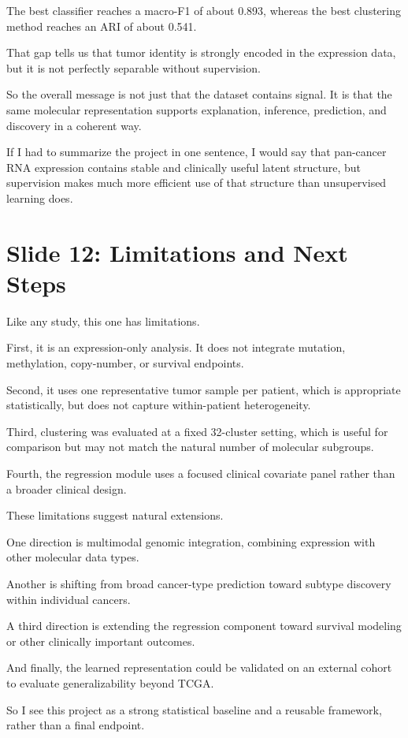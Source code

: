 \documentclass[12pt]{article}
\begin{document}
The best classifier reaches a macro-F1 of about 0.893, whereas the best clustering method reaches an ARI of about 0.541.

That gap tells us that tumor identity is strongly encoded in the expression data, but it is not perfectly separable without supervision.

So the overall message is not just that the dataset contains signal. It is that the same molecular representation supports explanation, inference, prediction, and discovery in a coherent way.

If I had to summarize the project in one sentence, I would say that pan-cancer RNA expression contains stable and clinically useful latent structure, but supervision makes much more efficient use of that structure than unsupervised learning does.

\section{Slide 12: Limitations and Next Steps}
Like any study, this one has limitations.

First, it is an expression-only analysis. It does not integrate mutation, methylation, copy-number, or survival endpoints.

Second, it uses one representative tumor sample per patient, which is appropriate statistically, but does not capture within-patient heterogeneity.

Third, clustering was evaluated at a fixed 32-cluster setting, which is useful for comparison but may not match the natural number of molecular subgroups.

Fourth, the regression module uses a focused clinical covariate panel rather than a broader clinical design.

These limitations suggest natural extensions.

One direction is multimodal genomic integration, combining expression with other molecular data types.

Another is shifting from broad cancer-type prediction toward subtype discovery within individual cancers.

A third direction is extending the regression component toward survival modeling or other clinically important outcomes.

And finally, the learned representation could be validated on an external cohort to evaluate generalizability beyond TCGA.

So I see this project as a strong statistical baseline and a reusable framework, rather than a final endpoint.
\end{document}
